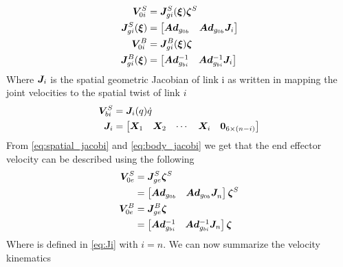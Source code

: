 \begin{align}
	\boldsymbol V_{0i}^S&= \boldsymbol J_{gi}^{S}(\boldsymbol \xi)\boldsymbol \zeta^S
  \label{eq:spatial_jacobi}
  \\
	\boldsymbol J_{gi}^{S}(\boldsymbol \xi) &= \begin{bmatrix} \boldsymbol{Ad}_{g_{0b}} & \boldsymbol{Ad}_{g_{0b}} \boldsymbol J_i\end{bmatrix}
  \label{eq:spatial_jacobi2}
	\\
	\boldsymbol V_{0i}^B&= \boldsymbol J_{gi}^{B}(\boldsymbol \xi)\boldsymbol \zeta
  \label{eq:body_jacobi}
  \\
	\boldsymbol J_{gi}^{B}(\boldsymbol \xi) &= \begin{bmatrix} \boldsymbol{Ad}_{g_{bi}}^{-1} & \boldsymbol{Ad}_{g_{bi}}^{-1} \boldsymbol J_i\end{bmatrix}
  \label{eq:body_jacobi2}
\end{align}
Where $\boldsymbol J_i$ is the spatial geometric Jacobian of link i as written in \cite{kristin_jant} mapping the joint velocities to the spatial twist of link $i$
\begin{align}
  \boldsymbol V_{bi}^S &=\boldsymbol J_i(q)\dot q
  \label{eq:mappint1}
	\\
	\boldsymbol J_i&=\begin{bmatrix}  \boldsymbol X_1 & \boldsymbol X_2 & \cdots & \boldsymbol X_i & \boldsymbol 0_{6 \times (n-i)}    \end{bmatrix}
	\label{eq:Ji}
\end{align}
From \eqref{eq:spatial_jacobi} and \eqref{eq:body_jacobi} we get that the end effector velocity can be described using the following
\begin{align}
	\boldsymbol V_{0e}^S &= \boldsymbol J_{ge}^{S}\boldsymbol \zeta^S
	\label{eq:ee_velo}
	\\
	&=\begin{bmatrix} \boldsymbol{Ad}_{g_{0b}} & \boldsymbol{Ad}_{g_{0b}}\boldsymbol J_{n}^{}\end{bmatrix}\boldsymbol \zeta^S
	\\
	\boldsymbol V_{0e}^B &= \boldsymbol J_{ge}^{B}\boldsymbol \zeta
	\label{eq:ee_velo_body}
	\\
	&= \begin{bmatrix} \boldsymbol{Ad}_{g_{bi}}^{-1} & \boldsymbol{Ad}_{g_{bi}}^{-1} \boldsymbol J_n\end{bmatrix}\boldsymbol \zeta
\end{align}
Where  is defined in \eqref{eq:Ji} with $i=n$. We can now summarize the velocity kinematics


